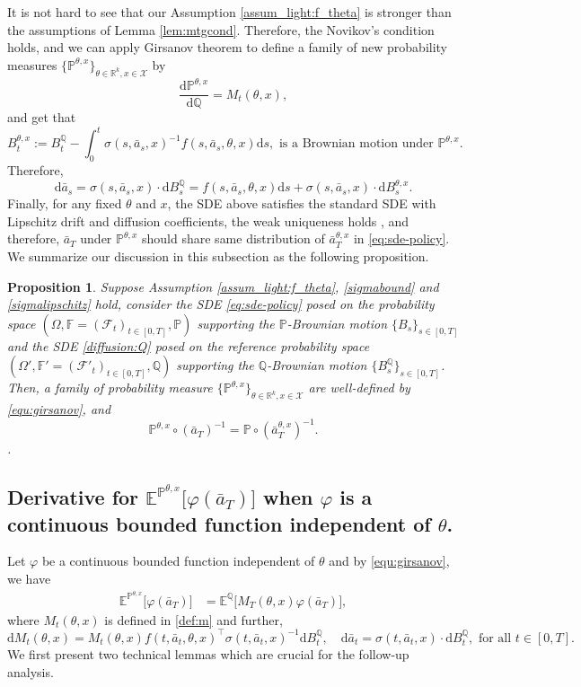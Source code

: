 \documentclass{article}
\newtheorem{prop}[thm]{Proposition}
\newcommand{\1}{\mathbbm{1}}
\numberwithin{equation}{section}
\def\cF{\mathcal{F}}
\def\cX{\mathcal{X}}
\def\d{{\mathrm{d}}}
\def\sE{{\mathbb{E}}}
\def\sF{{\mathbb{F}}}
\def\sP{\mathbb{P}}
\def\sQ{{\mathbb{Q}}}
\def\sR{{\mathbb R}}
\begin{document}
It is not hard to see that our Assumption \ref{assum_light:f_theta} is stronger than the assumptions of Lemma \ref{lem:mtgcond}. Therefore, the Novikov's condition holds, and we can apply Girsanov theorem to define a family of new probability measures $\{\sP^{\theta,x}\}_{\theta\in\sR^k,x\in\cX}$ by
\begin{equation}\label{equ:girsanov}
    \frac{\d \sP^{\theta,x}}{\d \sQ}=M_t(\theta,x),
\end{equation}
and get that
$$
B_t^{\theta,x}:=B_t^\sQ-\int_0^t\sigma(s,\bar a_s,x)^{-1}f(s,\bar a_s,\theta,x)\d s,\text{ is a Brownian motion under }\sP^{\theta,x}.
$$
Therefore, 
$$
\d \bar a_s=\sigma(s,\bar a_s,x)\cdot\d B_s^\sQ =f(s,\bar a_s,\theta,x)\d s +\sigma(s,\bar a_s,x)\cdot \d B_s^{\theta,x}. 
$$
Finally, for any fixed $\theta$ and $x$, the SDE above satisfies the standard SDE with Lipschitz drift and diffusion coefficients, the weak uniqueness holds \cite[Proposition 2.13 in Chapter 5]{karatzas1991brownian}, and therefore, $\bar a_T$ under $\sP^{\theta,x}$ should share same distribution of $\bar a^{\theta,x}_T$ in \eqref{eq:sde-policy}. We summarize our discussion in this subsection as the following proposition.

\begin{prop}
    Suppose Assumption \ref{assum_light:f_theta}, \eqref{sigmabound} and \eqref{sigmalipschitz} hold, consider the SDE \eqref{eq:sde-policy} posed on the probability space $(\Omega,\sF=(\cF_t)_{t\in[0,T]},\sP)$ supporting the $\sP$-Brownian motion $\{B_s\}_{s\in[0,T]}$ and the SDE \eqref{diffusion:Q} posed on the reference probability space $(\Omega',\sF'=(\cF'_t)_{t\in[0,T]},\sQ)$ supporting the $\sQ$-Brownian motion $\{B_s^\sQ\}_{s\in[0,T]}$. Then, a family of probability measure $\{\sP^{\theta,x}\}_{\theta\in\sR^k,x\in\cX}$ are well-defined by \eqref{equ:girsanov}, and 
    $$
    {\sP^{\theta,x}}\circ(\bar a_T)^{-1}={\sP}\circ(\bar a^{\theta,x}_T)^{-1}.
    $$.
\end{prop}




\subsection{Derivative for  $\sE^{\sP^{\theta,x}}\big[\varphi(\bar a_T)\big]$ when $\varphi$ is a continuous bounded function independent of $\theta$.}
Let $\varphi$ be a continuous bounded function independent of $\theta$ and by \eqref{equ:girsanov}, we have 
\begin{align*}
\sE^{\sP^{\theta,x}}\big[\varphi(\bar a_T)\big] 
&= \sE^\sQ\big[M_T(\theta,x)\varphi(\bar a_T)\big],
\end{align*}
where $M_t(\theta,x)$ is defined in \eqref{def:m} and further, 
$$
\d M_t(\theta,x) = M_t(\theta,x)f(t, \bar a_t,\theta,x)^\top\sigma(t,\bar a_t,x)^{-1}\d B_t^\sQ, \quad \d \bar a_t = \sigma(t,\bar a_t,x)\cdot \d B^\sQ_t,\text{ for all $t\in[0,T]$.}
$$
We first present two technical lemmas which are crucial for the follow-up analysis.
\end{document}
